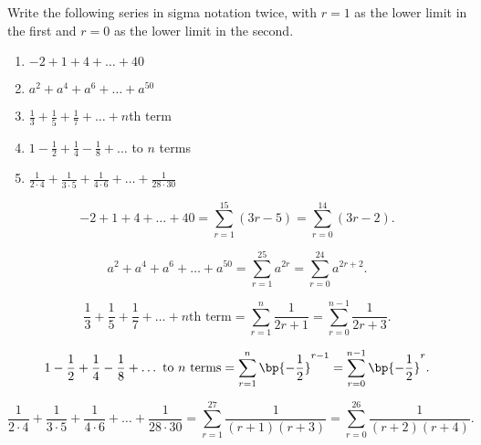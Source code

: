 \begin{problem}
    Write the following series in sigma notation twice, with $r = 1$ as the lower limit in the first and $r =0$ as the lower limit in the second.

    \begin{enumerate}
        \item $-2 + 1 + 4 + \ldots + 40$
        \item $a^2 + a^4 + a^6 + \ldots + a^{50}$
        \item $\frac13 + \frac15 + \frac17 + \ldots + n$th term
        \item $1 - \frac12 + \frac14 - \frac18 + \ldots$ to $n$ terms
        \item $\frac1{2\cdot4} + \frac1{3\cdot5} + \frac1{4 \cdot 6} + \ldots + \frac1{28 \cdot 30}$
    \end{enumerate}
\end{problem}
\begin{solution}
    \begin{ppart}
        \[-2 + 1 + 4 + \ldots + 40 = \sum_{r = 1}^{15} (3r-5) = \sum_{r = 0}^{14} (3r-2).\]
    \end{ppart}
    \begin{ppart}
        \[a^2 + a^4 + a^6 + \ldots + a^{50} = \sum_{r=1}^{25} a^{2r} = \sum_{r=0}^{24} a^{2r + 2}.\]
    \end{ppart}
    \begin{ppart}
        \[\frac13 + \frac15 + \frac17 + \ldots + n\text{th term} = \sum_{r=1}^n \frac1{2r+1} = \sum_{r=0}^{n-1} \frac1{2r+3}.\]
    \end{ppart}
    \begin{ppart}
        \[1 - \frac12 + \frac14 - \frac18 + \ldots \text{ to $n$ terms} = \sum_{r = 1}^n \bp{ -\frac12}^{r-1} = \sum_{r = 0}^{n-1} \bp{ -\frac12}^{r}.\]
    \end{ppart}
    \begin{ppart}
        \[\frac1{2\cdot4} + \frac1{3\cdot5} + \frac1{4 \cdot 6} + \ldots + \frac1{28 \cdot 30} = \sum_{r=1}^{27} \frac1{(r+1)(r+3)} = \sum_{r=0}^{26} \frac1{(r+2)(r+4)}.\]
    \end{ppart}
\end{solution}

